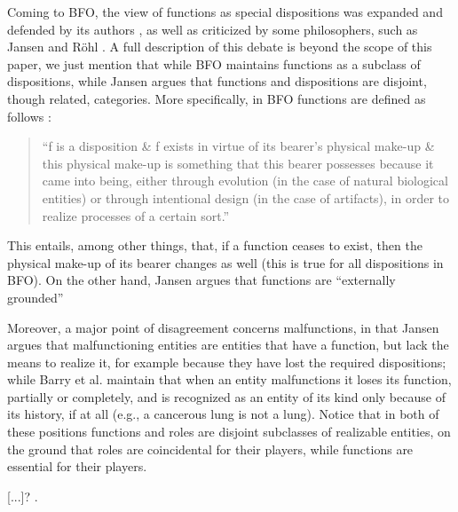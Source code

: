 \documentclass[sw]{iosart2x}
\newcommand{\BFO}{\textsc{BFO}\xspace}
\newcommand{\qquotes}[1]{``#1''}
\newcommand{\TODO}[1]{{\color{red} #1
}}
\begin{document}
Coming to \BFO, the view of functions as special dispositions was expanded and defended by its authors \cite{arpFunctionRoleDisposition2008,spearFunctionsBasicFormal2016}, as well as criticized by some philosophers, such as Jansen and Röhl \cite{rohlWhyFunctionsAre2014,jansenFunctionsMalfunctioningNegative2018}. 
A full description of this debate is beyond the scope of this paper, we just mention that while \BFO maintains functions as a subclass of dispositions, while Jansen argues that functions and dispositions are disjoint, though related, categories. 
More specifically, in \BFO functions are defined as follows \cite{spearFunctionsBasicFormal2016}:
\begin{quote}
  \qquotes{f is a disposition & f exists in virtue of its bearer’s physical make-up & this physical make-up is something that this bearer possesses because it came into being, either through evolution (in the case of natural biological entities) or through intentional design (in the case of artifacts), in order to realize processes of a certain sort.}
\end{quote} 
This entails, among other things, that, if a function ceases to exist, then the physical make-up of its bearer changes as well (this is true for all dispositions in \BFO).
On the other hand, Jansen argues that functions are \qquotes{externally grounded}

Moreover, a major point of disagreement concerns malfunctions, in that Jansen argues that malfunctioning entities are entities that have a function, but lack the means to realize it, for example because they have lost the required dispositions; while Barry et al. maintain that when an entity malfunctions it loses its function, partially or completely, and is recognized as an entity of its kind only because of its history, if at all (e.g., a cancerous lung is not a lung).
Notice that in both of these positions functions and roles are disjoint subclasses of realizable entities, on the ground that roles are coincidental for their players, while functions are essential for their players.

\TODO{[...]?}.
\end{document}

